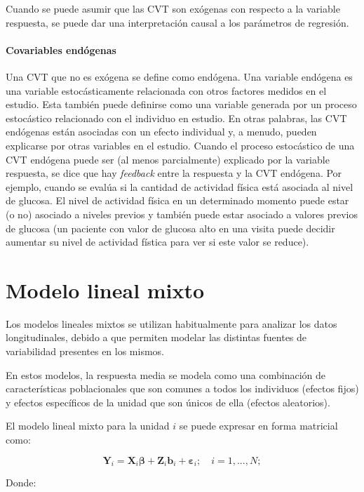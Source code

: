 \documentclass[spanish]{article}
\numberwithin{figure}{subsection}
\numberwithin{equation}{subsection}
\numberwithin{table}{subsection}
\begin{document}
Cuando se puede asumir que las CVT son exógenas con respecto a la variable
respuesta, se puede dar una interpretación causal a los parámetros de regresión.

\paragraph{Covariables endógenas} \mbox{}

Una CVT que no es exógena se define como endógena. Una variable endógena es una
variable estocásticamente relacionada con otros factores medidos en el estudio.
Esta también puede definirse como una variable generada por un proceso
estocástico relacionado con el individuo en estudio. En otras palabras, las CVT
endógenas están asociadas con un efecto individual y, a menudo, pueden
explicarse por otras variables en el estudio. Cuando el proceso estocástico de
una CVT endógena puede ser (al menos parcialmente) explicado por la variable
respuesta, se dice que hay \textit{feedback} entre la respuesta y la CVT
endógena. Por ejemplo, cuando se evalúa si la cantidad de actividad física está
asociada al nivel de glucosa. El nivel de actividad física en un determinado
momento puede estar (o no) asociado a niveles previos y también puede estar
asociado a valores previos de glucosa (un paciente con valor de glucosa alto
en una visita puede decidir aumentar su nivel de actividad fística para ver si
este valor se reduce).

\section{Modelo lineal mixto}

Los modelos lineales mixtos se utilizan habitualmente para analizar los datos
longitudinales, debido a que permiten modelar las distintas fuentes de
variabilidad presentes en los mismos.

En estos modelos, la respuesta media se modela como una combinación de
características poblacionales que son comunes a todos los individuos (efectos
fijos) y efectos específicos de la unidad que son únicos de ella (efectos
aleatorios).

El modelo lineal mixto para la unidad $i$ se puede expresar en forma matricial
como:

\[
	\bm{Y}_i = \bm{X}_i\bm{\beta} + \bm{Z}_i\bm{b}_i + \bm{\varepsilon}_i;
	\quad i = 1, ..., N;
\]

Donde:
\end{document}
